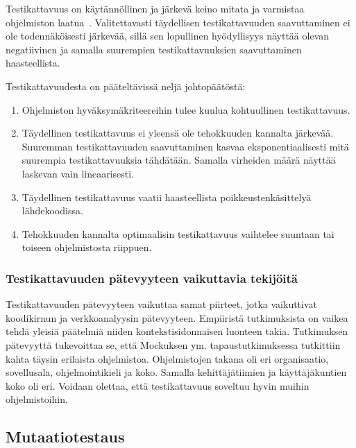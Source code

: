 \documentclass[finnish]{../tktltiki2}
\theoremstyle{definition}
\theoremstyle{remark}
\begin{document}
    Testikattavuus on käytännöllinen ja järkevä keino mitata ja varmistaa ohjelmiston laatua~\cite{MNDT09}. 
Valitettavasti täydellisen testikattavuuden saavuttaminen ei ole todennäköisesti järkevää, sillä sen lopullinen 
hyödyllisyys näyttää olevan negatiivinen ja samalla suurempien testikattavuuksien saavuttaminen haasteellista.\newline

\noindent Testikattavuudesta on pääteltävissä neljä johtopäätöstä:
    
\begin{enumerate}

    \item Ohjelmiston hyväksymäkriteereihin tulee kuulua kohtuullinen testikattavuus.
          
    \item Täydellinen testikattavuus ei yleensä ole tehokkuuden kannalta järkevää. Suuremman testikattavuuden 
          saavuttaminen kasvaa eksponentiaalisesti mitä suurempia testikattavuuksia tähdätään. Samalla 
          virheiden määrä näyttää laskevan vain lineaarisesti.
          
    \item Täydellinen testikattavuus vaatii haasteellista poikkeustenkäsittelyä lähde\-koodissa.
    
    \item Tehokkuuden kannalta optimaalisin testikattavuus vaihtelee suuntaan tai toiseen ohjelmistosta riippuen.

\end{enumerate}

\subsubsection{Testikattavuuden pätevyyteen vaikuttavia tekijöitä}

Testikattavuuden pätevyyteen vaikuttaa samat piirteet, jotka vaikuttivat koodikirnun ja verkkoanalyysin pätevyyteen. 
Empiiristä tutkimuksista on vaikea tehdä yleisiä päätelmiä niiden kontekstisidonnaisen luonteen takia. Tutkimuksen 
pätevyyttä tukevoittaa se, että Mockuksen ym. tapaustutkimuksessa tutkittiin kahta täysin erilaista ohjelmistoa. 
Ohjelmistojen takana oli eri organisaatio, sovellusala, ohjelmointikieli ja koko. Samalla kehittäjätiimien ja 
käyttäjäkuntien koko oli eri. Voidaan olettaa, että testikattavuus soveltuu hyvin muihin ohjelmistoihin.

\subsection{Mutaatiotestaus}
\end{document}
